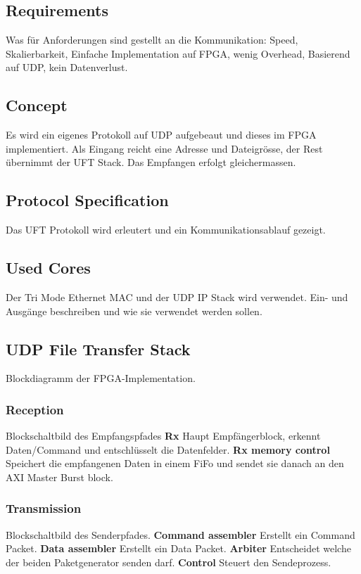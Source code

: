 \subsection{Requirements}
Was für Anforderungen sind gestellt an die Kommunikation: Speed, Skalierbarkeit,
Einfache Implementation auf FPGA, wenig Overhead, Basierend auf UDP, kein Datenverlust.

\subsection{Concept}
Es wird ein eigenes Protokoll auf UDP aufgebeaut und dieses im FPGA implementiert. 
Als Eingang reicht eine Adresse und Dateigrösse, der Rest übernimmt der UFT Stack.
Das Empfangen erfolgt gleichermassen.

\subsection{Protocol Specification}
Das UFT Protokoll wird erleutert und ein Kommunikationsablauf gezeigt.

\subsection{Used Cores}
Der Tri Mode Ethernet MAC und der UDP IP Stack wird verwendet. Ein- und Ausgänge 
beschreiben und wie sie verwendet werden sollen.

\subsection{UDP File Transfer Stack}
Blockdiagramm der FPGA-Implementation.
\subsubsection{Reception}
Blockschaltbild des Empfangspfades
\textbf{Rx}
Haupt Empfängerblock, erkennt Daten/Command und entschlüsselt die Datenfelder.
\textbf{Rx memory control}
Speichert die empfangenen Daten in einem FiFo und sendet sie danach an den AXI
Master Burst block.
\subsubsection{Transmission}
Blockschaltbild des Senderpfades.
\textbf{Command assembler}
Erstellt ein Command Packet.
\textbf{Data assembler}
Erstellt ein Data Packet.
\textbf{Arbiter}
Entscheidet welche der beiden Paketgenerator senden darf.
\textbf{Control}
Steuert den Sendeprozess.
